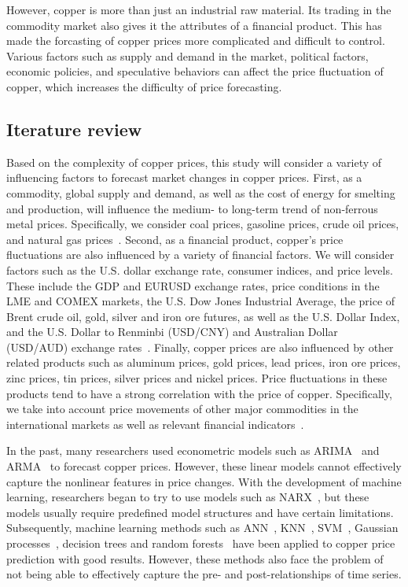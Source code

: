 \documentclass[project-plan]{report-template}
\begin{document}
\noindent However, copper is more than just an industrial raw material. Its trading in the commodity market also gives it the attributes of a financial product. This has made the forcasting of copper prices more complicated and difficult to control. Various factors such as supply and demand in the market, political factors, economic policies, and speculative behaviors can affect the price fluctuation of copper, which increases the difficulty of price forecasting.

\subsection{Iterature review}
\noindent Based on the complexity of copper prices, this study will consider a variety of influencing factors to forecast market changes in copper prices. First, as a commodity, global supply and demand, as well as the cost of energy for smelting and production, will influence the medium- to long-term trend of non-ferrous metal prices. Specifically, we consider coal prices, gasoline prices, crude oil prices, and natural gas prices~\cite{behmiri2015role}.
Second, as a financial product, copper's price fluctuations are also influenced by a variety of financial factors. We will consider factors such as the U.S. dollar exchange rate, consumer indices, and price levels. These include the GDP and EURUSD exchange rates, price conditions in the LME and COMEX markets, the U.S. Dow Jones Industrial Average, the price of Brent crude oil, gold, silver and iron ore futures, as well as the U.S. Dollar Index, and the U.S. Dollar to Renminbi (USD/CNY) and Australian Dollar (USD/AUD) exchange rates~\cite{frankel2010determinants, ciner2017predicting}.
Finally, copper prices are also influenced by other related products such as aluminum prices, gold prices, lead prices, iron ore prices, zinc prices, tin prices, silver prices and nickel prices. Price fluctuations in these products tend to have a strong correlation with the price of copper. Specifically, we take into account price movements of other major commodities in the international markets as well as relevant financial indicators~\cite{ozdemir2022medium, BUNCIC20151}.

\noindent In the past, many researchers used econometric models such as ARIMA~\cite{Asteriou2016ARIMAMA} and ARMA~\cite{whittle1951hypothesis} to forecast copper prices. However, these linear models cannot effectively capture the nonlinear features in price changes. With the development of machine learning, researchers began to try to use models such as NARX~\cite{lin1996learning, diaconescu2008use}, but these models usually require predefined model structures and have certain limitations. Subsequently, machine learning methods such as ANN~\cite{ZHANG2021102189}, KNN~\cite{altman1992introduction, chen2007narx}, SVM~\cite{cortes1995support}, Gaussian processes~\cite{frigola2013integrated}, decision trees and random forests~\cite{breiman2001random, diaz2020random} have been applied to copper price prediction with good results. However, these methods also face the problem of not being able to effectively capture the pre- and post-relationships of time series.
\end{document}
